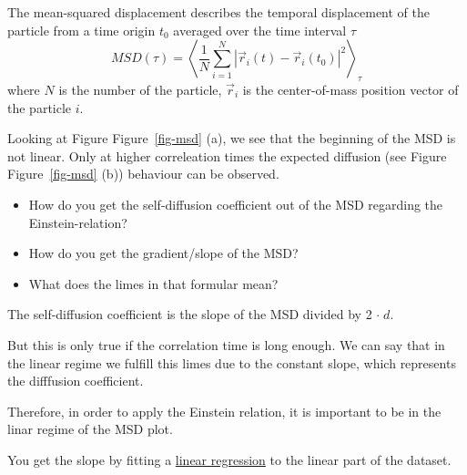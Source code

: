 \documentclass[
  letterpaper,
  DIV=11,
  numbers=noendperiod]{scrreprt}
\providecommand{\tightlist}{%
  \setlength{\itemsep}{0pt}\setlength{\parskip}{0pt}}\usepackage{longtable,booktabs,array}
\begin{document}
The mean-squared displacement describes the temporal displacement of the
particle from a time origin \(t_0\) averaged over the time interval
\(\tau\) \[
MSD(\tau) = \left < \frac{1}{N} \sum_{i=1}^{N} |\vec{r} _{i}(t) - \vec{r} _{i}(t_0)|^2  \right >_{\tau}
\] where \(N\) is the number of the particle, \(\vec{r}_{i}\) is the
center-of-mass position vector of the particle \(i\).

Looking at Figure Figure~\ref{fig-msd} (a), we see that the beginning of
the MSD is not linear. Only at higher correleation times the expected
diffusion (see Figure Figure~\ref{fig-msd} (b)) behaviour can be
observed.

\begin{tcolorbox}[enhanced jigsaw, title=\textcolor{quarto-callout-tip-color}{\faLightbulb}\hspace{0.5em}{Question:}, colbacktitle=quarto-callout-tip-color!10!white, bottomtitle=1mm, breakable, colframe=quarto-callout-tip-color-frame, toprule=.15mm, opacitybacktitle=0.6, bottomrule=.15mm, titlerule=0mm, arc=.35mm, rightrule=.15mm, toptitle=1mm, coltitle=black, left=2mm, opacityback=0, colback=white, leftrule=.75mm]

\begin{itemize}
\tightlist
\item
  How do you get the self-diffusion coefficient out of the MSD regarding
  the Einstein-relation?
\item
  How do you get the gradient/slope of the MSD?
\item
  What does the limes in that formular mean?
\end{itemize}

\end{tcolorbox}

\begin{tcolorbox}[enhanced jigsaw, title=\textcolor{quarto-callout-caution-color}{\faFire}\hspace{0.5em}{Answer:}, colbacktitle=quarto-callout-caution-color!10!white, bottomtitle=1mm, breakable, colframe=quarto-callout-caution-color-frame, toprule=.15mm, opacitybacktitle=0.6, bottomrule=.15mm, titlerule=0mm, arc=.35mm, rightrule=.15mm, toptitle=1mm, coltitle=black, left=2mm, opacityback=0, colback=white, leftrule=.75mm]

The self-diffusion coefficient is the slope of the MSD divided by 2
\(\cdot\;d\).

But this is only true if the correlation time is long enough. We can say
that in the linear regime we fulfill this limes due to the constant
slope, which represents the difffusion coefficient.

Therefore, in order to apply the Einstein relation, it is important to
be in the linar regime of the MSD plot.

You get the slope by fitting a
\protect\hyperlink{statistical-excursion}{linear regression} to the
linear part of the dataset.

\end{tcolorbox}
\end{document}
